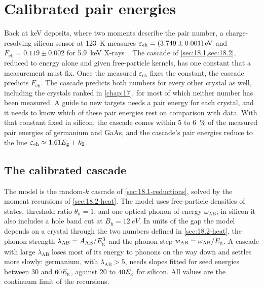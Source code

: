 \section{Calibrated pair energies}\label{sec:18.4}

Back at keV deposits, where two moments describe the pair number, a charge-resolving silicon sensor at \SI{123}{K} measures $\varepsilon_{\mathrm{eh}} = \SI{3.749 \pm 0.001}{eV}$ and $F_{\mathrm{eh}} = 0.119 \pm 0.002$ for \SI{5.9}{keV} X-rays~\cite{rodrigues2021absolute}. The cascade of \cref{sec:18.1,sec:18.2}, reduced to energy alone and given free-particle kernels, has one constant that a measurement must fix. Once the measured $\varepsilon_{\mathrm{eh}}$ fixes the constant, the cascade predicts $F_{\mathrm{eh}}$. The cascade predicts both numbers for every other crystal as well, including the crystals ranked in \cref{chap:17}, for most of which neither number has been measured. A guide to new targets needs a pair energy for each crystal, and it needs to know which of these pair energies rest on comparison with data. With that constant fixed in silicon, the cascade comes within 5 to \SI{6}{\percent} of the measured pair energies of germanium and GaAs, and the cascade's pair energies reduce to the line $\varepsilon_{\mathrm{eh}} \approx 1.61E_{\mathrm{g}} + k_2$.

\subsection{The calibrated cascade}\label{sec:18.4-model}

The model is the random-$k$ cascade of \cref{sec:18.1-reductions}, solved by the moment recursions of \cref{sec:18.2-heat}. The model uses free-particle densities of states, threshold ratio $\theta_{\mathrm{ii}} = 1$, and one optical phonon of energy $\omega_{\mathrm{AB}}$; in silicon it also includes a hole band cut at $B_{\mathrm{h}} = \SI{12}{eV}$. In units of the gap the model depends on a crystal through the two numbers defined in \cref{sec:18.2-heat}, the phonon strength $\lambda_{\mathrm{AB}} = A_{\mathrm{AB}}/E_{\mathrm{g}}^3$ and the phonon step $w_{\mathrm{AB}} = \omega_{\mathrm{AB}}/E_{\mathrm{g}}$. A cascade with large $\lambda_{\mathrm{AB}}$ loses most of its energy to phonons on the way down and settles more slowly: germanium, with $\lambda_{\mathrm{AB}} > 5$, needs slopes fitted for seed energies between 30 and $60E_{\mathrm{g}}$, against 20 to $40E_{\mathrm{g}}$ for silicon. All values are the continuum limit of the recursions.

